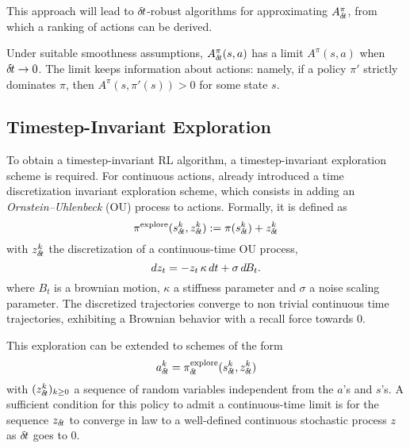 This approach will lead to ${\delta\hspace{-.1em}t}$-robust algorithms for
approximating $A^\pi_{\delta\hspace{-.1em}t}$, from which a ranking of actions can be
derived.

\begin{theorem}
\label{thm:Alimit}
Under suitable smoothness assumptions, $A^\pi_{\delta\hspace{-.1em}t}(s,a)$ has a limit
$A^\pi(s,a)$ when ${\delta\hspace{-.1em}t}\to 0$. The limit keeps information about
actions: namely, if a policy $\pi'$ strictly dominates $\pi$, 
then
$A^\pi(s,\pi'(s))>0$ for some state $s$.
\end{theorem}

\subsection{Timestep-Invariant Exploration}
\label{subsec:explo}

To obtain a timestep-invariant RL algorithm, a timestep-invariant
exploration scheme is required. 
For continuous actions, \cite{ddpg} already introduced a time discretization invariant exploration scheme, which consists in adding an
\emph{Ornstein--Uhlenbeck} \cite{orn-uhl} (OU) process to actions. Formally, it is defined as
\begin{equation}
	\pi^\text{explore}(s^k_{\delta\hspace{-.1em}t}, z^k_{\delta\hspace{-.1em}t}) \mathrel{\mathop{:}}= \pi(s^k_{\delta\hspace{-.1em}t}) + z^k_{\delta\hspace{-.1em}t}
\end{equation}
with $z^k_{\delta\hspace{-.1em}t}$ the discretization of a continuous-time OU process,
\begin{equation}
	dz_t = - z_t \,\kappa\, dt + \sigma \,d\hspace{-.1em}B_t.
	\label{eq:orn_uhl}
\end{equation}
where $B_t$ is a brownian motion, $\kappa$ a stiffness parameter and
$\sigma$ a noise scaling parameter. The discretized trajectories converge
to non trivial continuous time trajectories, exhibiting a Brownian
behavior with a recall force towards $0$.

This exploration can be extended to schemes of the form
\begin{equation}
  \label{eq:explore}
	a^k_{\delta\hspace{-.1em}t} = \pi^\text{explore}_{\delta\hspace{-.1em}t}(s^k_{\delta\hspace{-.1em}t}, z^k_{\delta\hspace{-.1em}t})
\end{equation}
with $(z^k_{\delta\hspace{-.1em}t})_{k\geq 0}$ a sequence of random variables independent from the $a$'s and $s$'s.
A sufficient condition for this policy to admit a continuous-time
limit is for the sequence
$z_{\delta\hspace{-.1em}t}$ to converge in law to a
well-defined continuous stochastic process $z$ as ${\delta\hspace{-.1em}t}$ goes to $0$.

